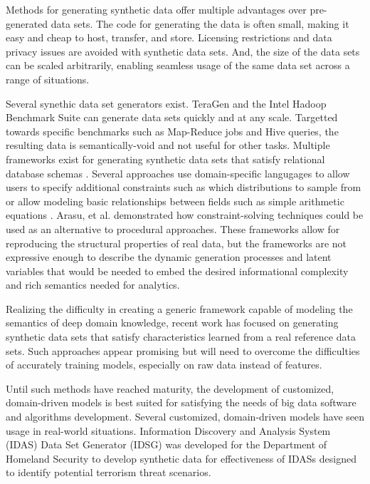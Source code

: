 \documentclass[conference]{IEEEtran}
\begin{document}
Methods for generating synthetic data offer multiple advantages over pre-generated data sets.  The code for generating the data is often small, making it easy and cheap to host, transfer, and store. Licensing restrictions and data privacy issues are avoided with synthetic data sets.  And, the size of the data sets can be scaled arbitrarily, enabling seamless usage of the same data set across a range of situations.  

Several synethic data set generators exist.  TeraGen and the Intel Hadoop Benchmark Suite \cite{Huang2010} can generate data sets quickly and at any scale. Targetted towards specific benchmarks such as Map-Reduce jobs and Hive queries, the resulting data is semantically-void and not useful for other tasks.  Multiple frameworks exist for generating synthetic data sets that satisfy relational database schemas \cite{Ghazal2013,Rabl2011a,Frank2012,Rabl2011,Gray1994,Bruno2005,Hoag2007}. Several approaches use domain-specific langugages \cite{Bruno2005,Hoag2007} to allow users to specify additional constraints such as which distributions to sample from or allow modeling basic relationships between fields such as simple arithmetic equations \cite{Alexandrov2012}. Arasu, et al. \cite{Arasu2011} demonstrated how constraint-solving techniques could be used as an alternative to procedural approaches. These frameworks allow for reproducing the structural properties of real data, but the frameworks are not expressive enough to describe the dynamic generation processes and latent variables that would be needed to embed the desired informational complexity and rich semantics needed for analytics.

Realizing the difficulty in creating a generic framework capable of modeling the semantics of deep domain knowledge, recent work\cite{Alexandrov2013} has focused on generating synthetic data sets that satisfy characteristics learned from a real reference data sets. Such approaches appear promising but will need to overcome the difficulties of accurately training models, especially on raw data instead of features.

Until such methods have reached maturity, the development of customized, domain-driven models is best suited for satisfying the needs of big data software and algorithms development. Several customized, domain-driven models have seen usage in real-world situations.  Information Discovery and Analysis System (IDAS) Data Set Generator (IDSG) \cite{Jeske2005,Lin2006} was developed for the Department of Homeland Security to develop synthetic data for effectiveness of IDASs designed to identify potential terrorism threat scenarios.
\end{document}
